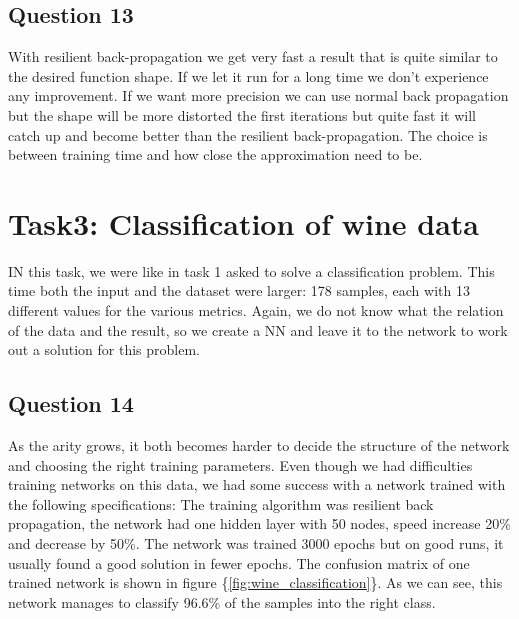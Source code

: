 \documentclass[a4paper]{article}
\begin{document}
\subsection*{Question 13}
With resilient back-propagation we get very fast a result that is quite similar to the desired function shape. If we let it run for a long time we don't experience any improvement. If we want more precision we can use normal back propagation but the shape will be more distorted the first iterations but quite fast it will catch up and become better than the resilient back-propagation. The choice is between training time and how close the approximation need to be. 

\section{Task3: Classification of wine data}
IN this task, we were like in task 1 asked to solve a classification problem. This time 
both the input and the dataset were larger: 178 samples, each with 13 different values for 
the various metrics. Again, we do not know what the relation of the data and the result, 
so we create a NN and leave it to the network to work out a solution for this problem.

\subsection*{Question 14}
As the arity grows, it both becomes harder to decide the structure of the network and 
choosing the right training parameters. Even though we had difficulties training networks 
on this data, we had some success with a 
network trained with the following specifications: The training algorithm was 
resilient back propagation, the network had one hidden layer with 50 
nodes, speed increase 20\% and decrease by 50\%. The network was trained 3000 epochs but 
on good runs, it usually found a good solution in fewer epochs. The confusion matrix 
of one trained network is shown in figure \{\ref{fig:wine_classification}\}. 
As we can see, this network manages to classify 96.6\% of the samples into the right class.
\end{document}
